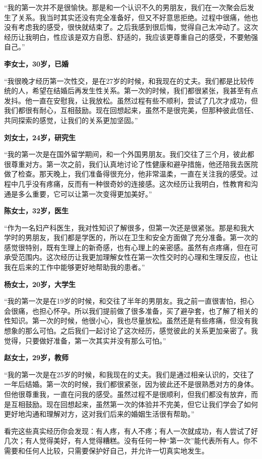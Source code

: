 \documentclass[12pt,UTF8]{ctexbook}
\begin{document}
“我的第一次并不是很愉快。那是和一个认识不久的男朋友，我们在一次聚会后发生了关系。我当时其实还没有完全准备好，但又不好意思拒绝。过程中很痛，他也没有考虑我的感受，很快就结束了。之后我感到很后悔，觉得自己太冲动了。这次经历让我明白，性应该是双方自愿、舒适的，我应该更尊重自己的感受，不要勉强自己。”

\textbf{李女士，30岁，已婚}

“我很晚才经历第一次性交，是在27岁的时候，和我现在的丈夫。我们都是比较传统的人，希望在结婚后再发生性关系。第一次的时候，我们都很紧张，我甚至有点发抖。他一直在安慰我，让我放松。虽然过程有些不顺利，尝试了几次才成功，但我们都很有耐心，互相鼓励。现在回想起来，虽然不是很完美，但那种彼此信任、共同探索的感觉，让我们的关系更加坚固。”

\textbf{刘女士，24岁，研究生}

“我的第一次是在国外留学期间，和一个外国男朋友。我们交往了三个月，彼此都很尊重对方。第一次之前，我们认真地讨论了性健康和避孕措施，他还陪我去医院做了检查。那天晚上，我们准备得很充分，他非常温柔，一直在关注我的感受。过程中几乎没有疼痛，反而有一种很奇妙的连接感。这次经历让我明白，性教育和沟通是多么重要，它可以让第一次变得更加美好。”

\textbf{陈女士，32岁，医生}

“作为一名妇产科医生，我对性知识了解很多，但第一次还是很紧张。那是和我大学时的男朋友，我们都是学医的，所以在卫生和安全方面做了充分准备。第一次的感觉很特别，既有生理上的新奇感，也有心理上的亲密感。虽然有点疼痛，但在可承受范围内。这次经历让我更加理解女性在第一次性交时的心理和生理反应，也让我在后来的工作中能够更好地帮助我的患者。”

\textbf{杨女士，20岁，大学生}

“我的第一次是在19岁的时候，和交往了半年的男朋友。我之前一直很害怕，担心会很痛，也担心怀孕。所以我们提前做了很多准备，买了避孕套，也了解了相关的性知识。第一次的时候，他很小心，我也尽量放松。虽然还是有些疼痛，但没有我想象的那么可怕。之后我们一起讨论了这次经历，感觉彼此的关系更加亲密了。我觉得，只要做好准备，第一次其实并没有那么可怕。”

\textbf{赵女士，29岁，教师}

“我的第一次是在25岁的时候，和我现在的丈夫。我们是通过相亲认识的，交往了一年后结婚。第一次的时候，我们都很紧张，因为彼此还不是很熟悉对方的身体。但他很尊重我，一直在问我的感受。虽然过程不是很顺利，但我们都没有放弃，而是互相鼓励。现在回想起来，虽然第一次的体验并不完美，但它让我们学会了如何更好地沟通和理解对方，这对我们后来的婚姻生活很有帮助。”

\begin{tcolorbox}[colback=pink!5!white,colframe=red!50!black,title=贴心小叮咛]
看完这些真实经历你会发现：有人疼，有人不疼；有人一次就成功，有人尝试了好几次；有人觉得美好，有人觉得糟糕。没有任何一种“第一次”能代表所有人。你不需要和任何人比较，只需要保护好自己，并允许一切真实地发生。
\end{tcolorbox}
\end{document}
